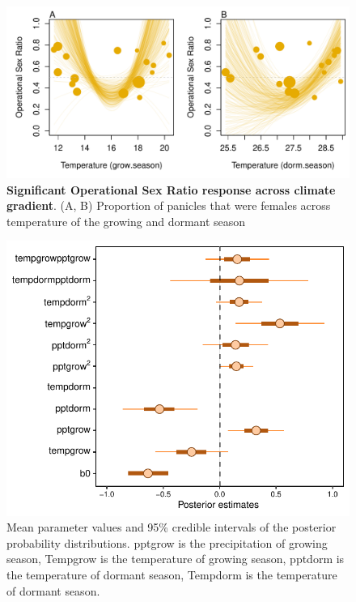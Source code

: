 \documentclass[12pt]{article}\usepackage[]{graphicx}\usepackage[dvipsnames]{xcolor}
\begin{document}
\begin{figure}[H]
	\begin{center}
		\includegraphics[width=0.95\linewidth]{Figures/gardens_OSR.pdf}
		\caption{\textbf{Significant Operational Sex Ratio response across climate gradient}.
			(A, B) Proportion of panicles that were females across  temperature of the growing and dormant season }
		\label{Sup:gardens_OSR}
	\end{center}
\end{figure}

\begin{figure}[H]
	\begin{center}
		\includegraphics[width=0.70\linewidth]{Figures/Posterior_ORS.pdf}
		\caption{Mean parameter values and 95\% credible intervals of the posterior probability distributions. 
		pptgrow is  the precipitation of growing season,
		Tempgrow is the temperature of growing season,
		pptdorm is the temperature of dormant season,
		Tempdorm is the temperature of dormant season.}
		\label{Sup:posterior_OSR}
	\end{center}
\end{figure}


\end{document}
